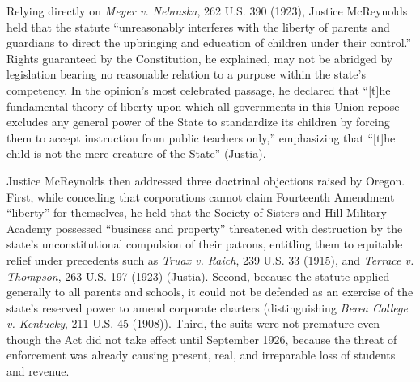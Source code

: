 \documentclass[12pt]{article}
\begin{document}
Relying directly on \textit{Meyer v. Nebraska}, 262 U.S. 390 (1923), Justice McReynolds held that the statute ``unreasonably interferes with the liberty of parents and guardians to direct the upbringing and education of children under their control.'' Rights guaranteed by the Constitution, he explained, may not be abridged by legislation bearing no reasonable relation to a purpose within the state's competency. In the opinion's most celebrated passage, he declared that ``[t]he fundamental theory of liberty upon which all governments in this Union repose excludes any general power of the State to standardize its children by forcing them to accept instruction from public teachers only,'' emphasizing that ``[t]he child is not the mere creature of the State'' (\href{https://supreme.justia.com/cases/federal/us/268/510/}{Justia}).

Justice McReynolds then addressed three doctrinal objections raised by Oregon. First, while conceding that corporations cannot claim Fourteenth Amendment ``liberty'' for themselves, he held that the Society of Sisters and Hill Military Academy possessed ``business and property'' threatened with destruction by the state's unconstitutional compulsion of their patrons, entitling them to equitable relief under precedents such as \textit{Truax v. Raich}, 239 U.S. 33 (1915), and \textit{Terrace v. Thompson}, 263 U.S. 197 (1923) (\href{https://supreme.justia.com/cases/federal/us/268/510/}{Justia}). Second, because the statute applied generally to all parents and schools, it could not be defended as an exercise of the state's reserved power to amend corporate charters (distinguishing \textit{Berea College v. Kentucky}, 211 U.S. 45 (1908)). Third, the suits were not premature even though the Act did not take effect until September 1926, because the threat of enforcement was already causing present, real, and irreparable loss of students and revenue.
\end{document}
